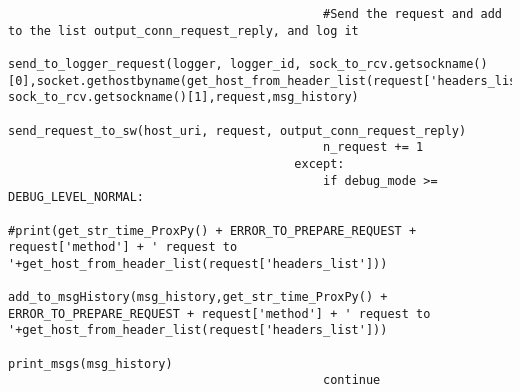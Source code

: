 \begin{verbatim}
                                            #Send the request and add to the list output_conn_request_reply, and log it
                                            send_to_logger_request(logger, logger_id, sock_to_rcv.getsockname()[0],socket.gethostbyname(get_host_from_header_list(request['headers_list'])), sock_to_rcv.getsockname()[1],request,msg_history)
                                            send_request_to_sw(host_uri, request, output_conn_request_reply)
                                            n_request += 1
                                        except:
                                            if debug_mode >= DEBUG_LEVEL_NORMAL:
                                                #print(get_str_time_ProxPy() + ERROR_TO_PREPARE_REQUEST + request['method'] + ' request to '+get_host_from_header_list(request['headers_list']))
                                                add_to_msgHistory(msg_history,get_str_time_ProxPy() + ERROR_TO_PREPARE_REQUEST + request['method'] + ' request to '+get_host_from_header_list(request['headers_list']))
                                                print_msgs(msg_history)
                                            continue


\end{verbatim}
